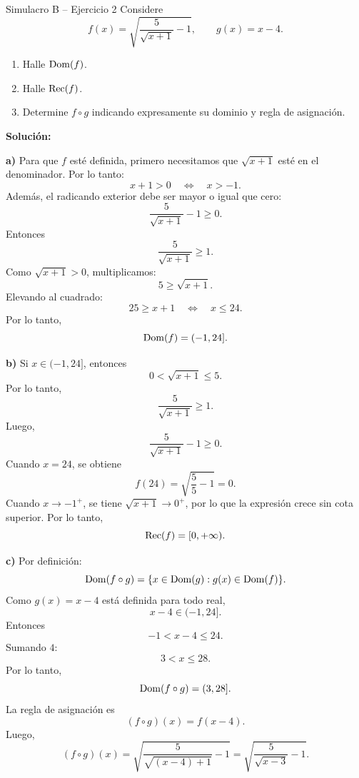 \documentclass[letterpaper, 12pt]{article}
\begin{document}
\begin{solucionbox}{Simulacro B -- Ejercicio 2}
Considere
\[
    f(x)=\sqrt{\frac{5}{\sqrt{x+1}}-1},
    \qquad
    g(x)=x-4.
\]
\begin{enumerate}[label=\textbf{\alph*)}]
    \item Halle $\operatorname{Dom}(f)$.
    \item Halle $\operatorname{Rec}(f)$.
    \item Determine $f\circ g$ indicando expresamente su dominio y regla de asignaci\'on.
\end{enumerate}

\textbf{Soluci\'on:}

\textbf{a)} Para que $f$ est\'e definida, primero necesitamos que $\sqrt{x+1}$ est\'e en el denominador. Por lo tanto:
\[
    x+1>0
    \quad\Longleftrightarrow\quad
    x>-1.
\]
Adem\'as, el radicando exterior debe ser mayor o igual que cero:
\[
    \frac{5}{\sqrt{x+1}}-1\geq0.
\]
Entonces
\[
    \frac{5}{\sqrt{x+1}}\geq1.
\]
Como $\sqrt{x+1}>0$, multiplicamos:
\[
    5\geq \sqrt{x+1}.
\]
Elevando al cuadrado:
\[
    25\geq x+1
    \quad\Longleftrightarrow\quad
    x\leq24.
\]
Por lo tanto,
\[
    \operatorname{Dom}(f)=(-1,24].
\]

\textbf{b)} Si $x\in(-1,24]$, entonces
\[
    0<\sqrt{x+1}\leq5.
\]
Por lo tanto,
\[
    \frac{5}{\sqrt{x+1}}\geq1.
\]
Luego,
\[
    \frac{5}{\sqrt{x+1}}-1\geq0.
\]
Cuando $x=24$, se obtiene
\[
    f(24)=\sqrt{\frac{5}{5}-1}=0.
\]
Cuando $x\to -1^+$, se tiene $\sqrt{x+1}\to0^+$, por lo que la expresi\'on crece sin cota superior. Por lo tanto,
\[
    \operatorname{Rec}(f)=[0,+\infty).
\]

\textbf{c)} Por definici\'on:
\[
    \operatorname{Dom}(f\circ g)=\{x\in\operatorname{Dom}(g):g(x)\in\operatorname{Dom}(f)\}.
\]
Como $g(x)=x-4$ est\'a definida para todo real,
\[
    x-4\in(-1,24].
\]
Entonces
\[
    -1<x-4\leq24.
\]
Sumando $4$:
\[
    3<x\leq28.
\]
Por lo tanto,
\[
    \operatorname{Dom}(f\circ g)=(3,28].
\]
La regla de asignaci\'on es
\[
    (f\circ g)(x)=f(x-4).
\]
Luego,
\[
    (f\circ g)(x)=
    \sqrt{\frac{5}{\sqrt{(x-4)+1}}-1}
    =
    \sqrt{\frac{5}{\sqrt{x-3}}-1}.
\]

\respuesta{$\Dom(f)=(-1,24]$, $\Rec(f)=[0,+\infty)$, $\Dom(f\circ g)=(3,28]$ y $(f\circ g)(x)=\sqrt{\dfrac{5}{\sqrt{x-3}}-1}$.}
\end{solucionbox}
\end{document}
